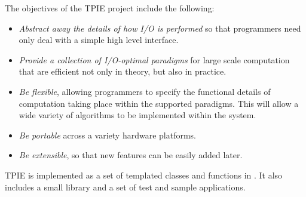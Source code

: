 

The objectives of the TPIE project include the following:

\begin{itemize}
\item \emph{Abstract away the details of how I/O is performed} so that
  programmers need only deal with a simple high level interface.
\item \emph{Provide a collection of I/O-optimal paradigms} for large
  scale computation that are efficient not only in theory, but also in
  practice.
\item \emph{Be flexible}, allowing programmers to specify the
  functional details of computation taking place within the supported
  paradigms.  This will allow a wide variety of algorithms to be
  implemented within the system.
\item \emph{Be portable} across a variety hardware platforms.
\item \emph{Be extensible}, so that new features can be easily added
  later.
\end{itemize}

TPIE is implemented as a set of templated classes and functions in
\CPP{}. It also includes a small library and a set of test
and sample applications.

